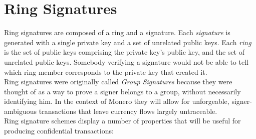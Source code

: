 \chapter{Ring Signatures}
\label{chapter:ring-signatures}


Ring signatures are composed of a ring and a signature. Each {\em signature} is generated with a single private key and a set of unrelated public keys. Each {\em ring} is the set of public keys comprising the private key’s public key, and the set of unrelated public keys. Somebody verifying a signature would not be able to tell which ring member corresponds to the private key that created it.
\\

Ring signatures were originally called {\em Group Signatures} because they were thought of as a way to prove a signer belongs to a group, without necessarily identifying him. In the context of Monero they will allow for unforgeable, signer-ambiguous transactions that leave currency flows largely untraceable.
\\

Ring signature schemes display a number of properties that will be useful for producing confidential transactions:

